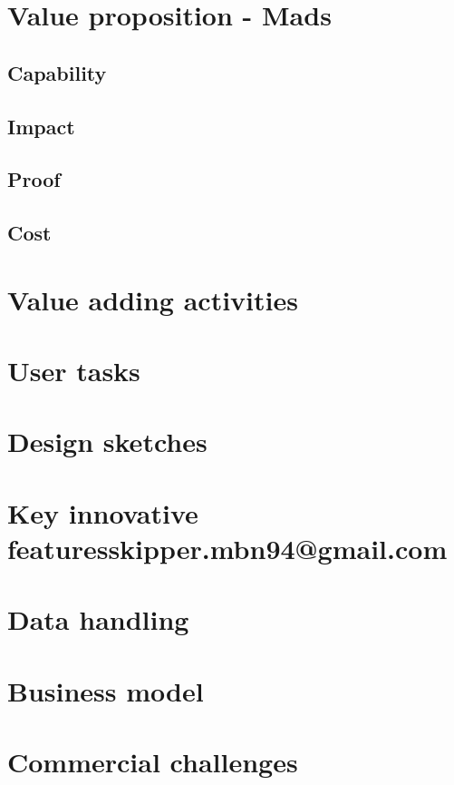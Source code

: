 \documentclass[a4paper,12pt,fleqn,dvipsnames,oneside,openright]{memoir}
\begin{document}
\chapter{Value proposition - Mads}
\section{Capability}

\section{Impact}

\section{Proof}

\section{Cost}


\chapter{Value adding activities}

\chapter{User tasks}

\chapter{Design sketches}

\chapter{Key innovative featuresskipper.mbn94@gmail.com}


\chapter{Data handling}

\chapter{Business model}

\chapter{Commercial challenges}
\end{document}
